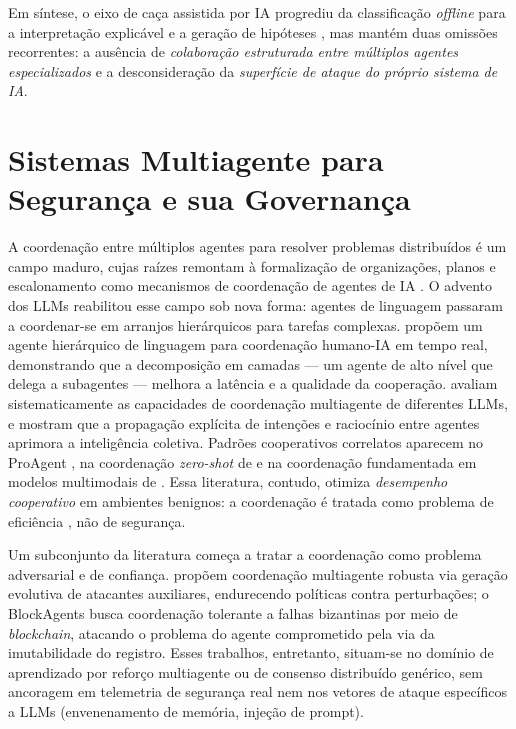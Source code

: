 Em síntese, o eixo de caça assistida por IA progrediu da classificação
\textit{offline} \cite{HADDADPAJOUH201888,ucci2019} para a interpretação
explicável \cite{ali2023huntgptintegratingmachinelearningbased} e a geração de
hipóteses \cite{10713082,10750987}, mas mantém duas omissões recorrentes: a
ausência de \textit{colaboração estruturada entre múltiplos agentes
especializados} e a desconsideração da \textit{superfície de ataque do próprio
sistema de IA}.

\section{Sistemas Multiagente para Segurança e sua Governança}
\label{sec:rel-mas-governanca}

A coordenação entre múltiplos agentes para resolver problemas distribuídos é um
campo maduro, cujas raízes remontam à formalização de organizações, planos e
escalonamento como mecanismos de coordenação de agentes de IA
\cite{durfee1993organizations}. O advento dos LLMs reabilitou esse campo sob nova
forma: agentes de linguagem passaram a coordenar-se em arranjos hierárquicos para
tarefas complexas.  propõem um agente hierárquico de
linguagem para coordenação humano-IA em tempo real, demonstrando que a
decomposição em camadas --- um agente de alto nível que delega a subagentes ---
melhora a latência e a qualidade da cooperação. 
avaliam sistematicamente as capacidades de coordenação multiagente de diferentes
LLMs, e 
mostram que a propagação explícita de intenções e raciocínio entre agentes
aprimora a inteligência coletiva. Padrões cooperativos correlatos aparecem no
ProAgent \cite{DBLP:journals/corr/abs-2308-11339}, na coordenação \textit{zero-shot}
de  e na coordenação fundamentada em modelos
multimodais de .
Essa literatura, contudo, otimiza \textit{desempenho cooperativo} em ambientes
benignos: a coordenação é tratada como problema de eficiência
\cite{bai2024reducingredundantcomputationmultiagent}, não de segurança.

Um subconjunto da literatura começa a tratar a coordenação como problema
adversarial e de confiança. 
propõem coordenação multiagente robusta via geração evolutiva de atacantes
auxiliares, endurecendo políticas contra perturbações; o BlockAgents
\cite{doe2023emergent} busca coordenação tolerante a falhas bizantinas por meio de
\textit{blockchain}, atacando o problema do agente comprometido pela via da
imutabilidade do registro. Esses trabalhos, entretanto, situam-se no domínio de
aprendizado por reforço multiagente ou de consenso distribuído genérico, sem
ancoragem em telemetria de segurança real nem nos vetores de ataque específicos a
LLMs (envenenamento de memória, injeção de prompt).

